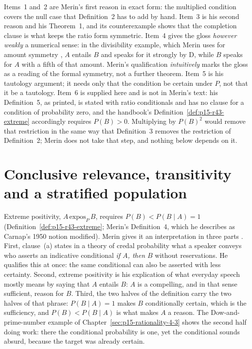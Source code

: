 Items~1 and~2 are Merin's first reason in exact form: the multiplied
condition covers the null case that Definition~2 has to add by hand.
Item~3 is his second reason and his Theorem~1, and its counterexample
shows that the completion clause is what keeps the ratio form
symmetric. Item~4 gives the gloss \emph{however weakly} a numerical
sense: in the divisibility example, which Merin uses for amount symmetry
\cite[p.~272]{Merin2021Relevance}, \(A\) entails \(B\) and speaks for it
strongly by D, while \(B\) speaks for \(A\) with a fifth of that amount.
Merin's qualification \emph{intuitively} marks the gloss as a reading of
the formal symmetry, not a further theorem. Item~5 is his tautology
argument; it needs only that the condition be certain under \(P\), not
that it be a tautology. Item~6 is supplied here and is not in Merin's
text: his Definition~5, as printed, is stated with ratio conditionals
and has no clause for a condition of probability zero, and the handbook's
Definition~\ref{def:p15-r43-extreme} accordingly requires \(P(B)>0\).
Multiplying by \(P(B)^2\) would remove that restriction in the same way
that Definition~3 removes the restriction of Definition~2; Merin does
not take that step, and nothing below depends on it.

\section{Conclusive relevance, transitivity and a stratified population}
\label{sec:p15-w02c-p15-027-extreme}

Extreme positivity, \(A\,\mathrm{expos}_P\,B\), requires
\(P(B)<P(B\mid A)=1\) (Definition~\ref{def:p15-r43-extreme}; Merin's
Definition~4, which he describes as Carnap's 1950 notion modified).
Merin gives it an interpretation in three parts
\cite[p.~266]{Merin2021Relevance}. First, clause~(a) states in a theory
of credal probability what a speaker conveys who asserts an indicative
conditional \emph{if \(A\), then \(B\)} without reservations. He
qualifies this at once: the same conditional can also be asserted with
less certainty. Second, extreme positivity is his explication of what
everyday speech mostly means by saying that \(A\) entails \(B\): \(A\) is
a compelling, and in that sense sufficient, reason for \(B\). Third, the
two halves of the definition carry the two halves of that phrase:
\(P(B\mid A)=1\) makes \(B\) conditionally certain, which is the
sufficiency, and \(P(B)<P(B\mid A)\) is what makes \(A\) a reason. The
Dow-and-prime-number example of Chapter~\ref{sec:p15-rationality-4-3}
shows the second half doing work: there the conditional probability is
one, yet the conditional sounds absurd, because the target was already
certain.

